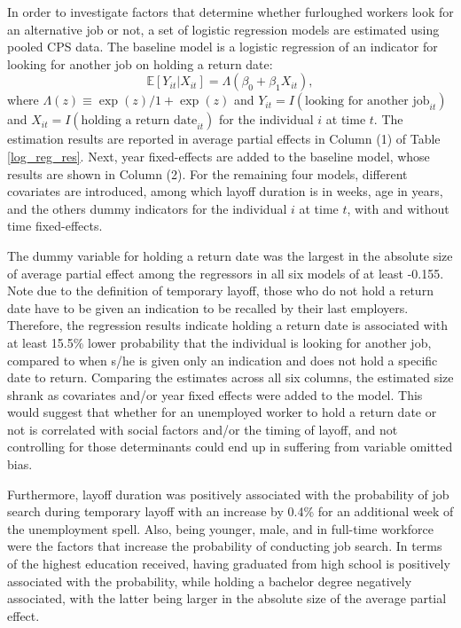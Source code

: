 \documentclass[a4paper, 11pt, tikz]{article}
\newcommand{\E}{\mathbb{E}}
\begin{document}
In order to investigate factors that determine whether furloughed workers look for an alternative job or not, a set of logistic regression models are estimated using pooled CPS data.
The baseline model is a logistic regression of an indicator for looking for another job on holding a return date:
\begin{equation}
  \E[Y_{it}|X_{it}] = \Lambda(\beta_0 + \beta_1 X_{it}),
\end{equation}
where $\Lambda(z) \equiv \exp(z) / {1 + \exp(z)}$ and $Y_{it} = I(\text{looking for another job}_{it})$ and $X_{it} = I(\text{holding a return date}_{it})$ for the individual $i$ at time $t$.
The estimation results are reported in average partial effects in Column (1) of Table \ref{log_reg_res}.
Next, year fixed-effects are added to the baseline model, whose results are shown in Column (2).
For the remaining four models, different covariates are introduced, among which layoff duration is in weeks, age in years, and the others dummy indicators for the individual $i$ at time $t$, with and without time fixed-effects.

The dummy variable for holding a return date was the largest in the absolute size of average partial effect among the regressors in all six models of at least -0.155.
Note due to the definition of temporary layoff, those who do not hold a return date have to be given an indication to be recalled by their last employers.
Therefore, the regression results indicate holding a return date is associated with at least 15.5\% lower probability that the individual is looking for another job, compared to when s/he is given only an indication and does not hold a specific date to return.
Comparing the estimates across all six columns, the estimated size shrank as covariates and/or year fixed effects were added to the model.
This would suggest that whether for an unemployed worker to hold a return date or not is correlated with social factors and/or the timing of layoff, and not controlling for those determinants could end up in suffering from variable omitted bias.

Furthermore, layoff duration was positively associated with the probability of job search during temporary layoff with an increase by 0.4\% for an additional week of the unemployment spell.
Also, being younger, male, and in full-time workforce were the factors that increase the probability of conducting job search.
In terms of the highest education received, having graduated from high school is positively associated with the probability, while holding a bachelor degree negatively associated, with the latter being larger in the absolute size of the average partial effect.
\end{document}
